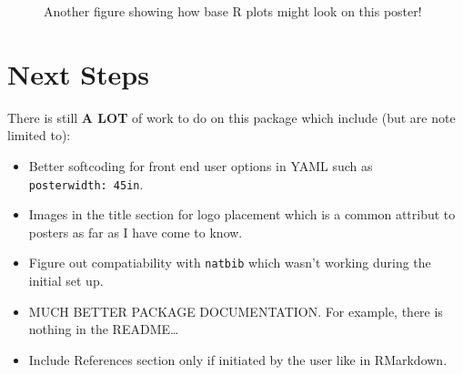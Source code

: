 \documentclass[article,30pt,extrafontsizes]{memoir}
\begin{document}
\begin{adjmulticols*}{3}{10mm}{10mm}
{\begin{figure}
{}

\caption{Another figure showing how base R plots might look on this poster!}\label{fig:unnamed-chunk-6}
\end{figure}

\section{Next Steps}\label{next-steps}

There is still \textbf{A LOT} of work to do on this package which
include (but are note limited to):

\begin{itemize}
\tightlist
\item
  Better softcoding for front end user options in YAML such as
  \texttt{posterwidth:\ 45in}.
\item
  Images in the title section for logo placement which is a common
  attribut to posters as far as I have come to know.
\item
  Figure out compatiability with \texttt{natbib} which wasn't working
  during the initial set up.
\item
  MUCH BETTER PACKAGE DOCUMENTATION. For example, there is nothing in
  the README\ldots{}
\item
  Include References section only if initiated by the user like in
  RMarkdown.
\end{itemize}

\small
\printbibliography
}
\end{adjmulticols*}
\end{document}
